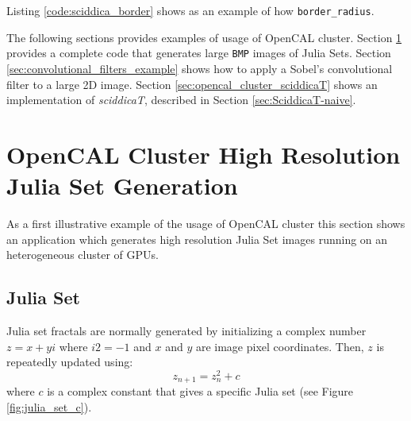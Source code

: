 Listing \ref{code:sciddica_border} shows as an  example  of how \texttt{border\_radius}.


The following sections provides examples of usage of OpenCAL cluster. Section \ref{sec:opencal_julia} provides a complete code that generates large \texttt{BMP} images of Julia Sets.
Section \ref{sec:convolutional_filters_example} shows how to apply a Sobel's convolutional filter to a large 2D image.
Section \ref{sec:opencal_cluster_sciddicaT} shows an implementation of \textit{sciddicaT}, described in Section \ref{sec:SciddicaT-naive}. 
\section{OpenCAL Cluster High Resolution Julia Set Generation}
\label{sec:opencal_julia}
As a first illustrative example of the usage of OpenCAL cluster this section shows an application which generates high resolution Julia Set images running on an heterogeneous cluster of GPUs.

\subsection{Julia Set}
\label{sec:julia_math}
Julia set fractals are normally generated by initializing a complex number  $z = x + yi$  where  $i2 = -1$  and $x$ and $y$ are image pixel coordinates. Then, $z$ is repeatedly updated using:
\[ 
 z_{n+1} = z_n^2 + c
\]  
where $c$ is a complex constant that gives a specific Julia set (see Figure \ref{fig:julia_set_c}).

